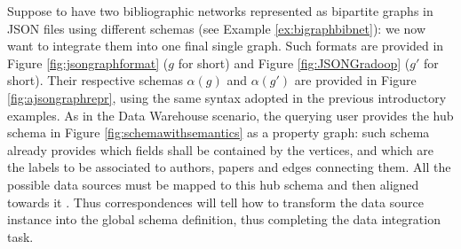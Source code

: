 \begin{example}[label=ex:examplegraphdata]
Suppose to have two bibliographic networks represented as bipartite graphs in JSON files using different schemas (see Example \vref{ex:bigraphbibnet}): we now want to integrate them into one final single graph. %
Such formats are provided in Figure \ref{fig:jsongraphformat} ($g$ for short) and Figure \ref{fig:JSONGradoop} ($g'$ for short). %
Their respective schemas $\alpha(g)$ and $\alpha(g')$ are  provided in Figure \ref{fig:ajsongraphrepr}, using the same syntax adopted in the previous introductory examples. %
As in the Data Warehouse scenario, the querying user provides the hub schema  \cite{GrossHKR11,HartungGR13}  in Figure \vref{fig:schemawithsemantics} as a property graph:  such schema already provides which fields shall be contained by the vertices, and which are the labels to be associated to authors, papers and  edges connecting them. %
All the possible data sources must be mapped to this hub schema and then aligned towards it %
\cite{euzenat2013d}. Thus correspondences will tell how to transform the data source instance into the global schema definition, thus completing the data integration task.


\end{example}
